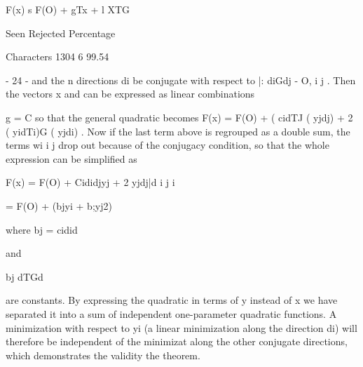  
                      F(x) s F(O) + gTx + l XTG
 
                 Seen Rejected  Percentage
 
Characters       1304        6   99.54
 
                                 - 24 -
and the n directions di be conjugate with respect to |:
diGdj - O, i  j .
Then the vectors x and  can be expressed as linear combinations
 
 
 
 
 
 
                              g =  C
so that the general quadratic becomes
      F(x) = F(O) + (  cidTJ ( yjdj) + 2 ( yidTi)G ( yjdi) .
Now  if the last term above is regrouped as a double sum, the terms wi
i  j drop out because of the conjugacy condition, so that the whole
expression can be simplified as
 
 
               F(x) = F(O) +     Cididjyj + 2  yjdj|d
                       i j               i
 
 
               = F(O) +   (bjyi + b;yj2)
 
 
where
                                     bj =  cidid
 
 
and
 
                               bj   dTGd
 
 
 
 
 
 
 
 
 
 
 
 
 
 
 
 
 
 
 
 
 
 
 
 
 
 
 
 
 
 
 
 
 
 
 
 
 
 
 
 
 
 
 
 
 
 
 
 
 
 
 
 
are constants.  By expressing the quadratic in terms of y instead of x
we have separated it into a sum of independent one-parameter quadratic
functions.  A minimization with respect to yi (a linear minimization
along the direction di) will therefore be independent of the minimizat
along the other conjugate directions, which demonstrates the validity
the theorem.
 
